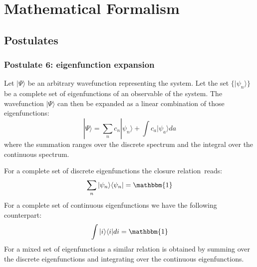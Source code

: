 \chapter{Mathematical Formalism}

\section{Postulates}
\subsection{Postulate 6: eigenfunction expansion}

    
	\begin{formula}
    		Let $|\Psi\rangle$ be an arbitrary wavefunction representing the system. Let the set $\{|\psi_n\rangle\}$ be a complete set of eigenfunctions of an observable of the system. The wavefunction $|\Psi\rangle$ can then be expanded as a linear combination of those eigenfunctions:
		\begin{equation}
	        	\label{qm_formalism:eigenfunction_expansion}
			\boxed{|\Psi\rangle = \sum_nc_n|\psi_n\rangle + \int c_a|\psi_a\rangle da}
		\end{equation}
	        where the summation ranges over the discrete spectrum and the integral over the continuous spectrum.
	\end{formula}
   
	\begin{formula}
	    	For a complete set of discrete eigenfunctions the closure relation\footnotemark\ reads:
		\begin{equation}
		        \label{qm_formalism:closure}
			\sum_n|\psi_n\rangle\langle\psi_n| = \mathbbm{1}
		\end{equation}
	        For a complete set of continuous eigenfunctions we have the following counterpart:
	        \begin{equation}
		        \label{qm_formalism:closure_continuouos}
			\int|i\rangle\langle i|di = \mathbbm{1}
		\end{equation}
	        For a mixed set of eigenfunctions a similar relation is obtained by summing over the discrete eigenfunctions and integrating over the continuous eigenfunctions.
	\end{formula}

